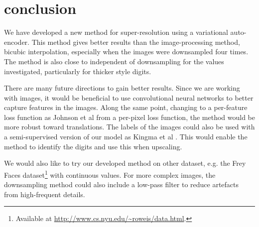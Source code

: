 \section{conclusion}
\label{sec:conclusion}

We have developed a new method for super-resolution using a variational auto-encoder.
This method gives better results than the image-processing method, bicubic interpolation, especially when the images were downsampled four times.
The method is also close to independent of downsampling for the values investigated, particularly for thicker style digits.

There are many future directions to gain better results.
Since we are working with images, it would be beneficial to use convolutional neural networks to better capture features in the images.
Along the same point, changing to a per-feature loss function as Johnson et al \cite{Johnson16} from a per-pixel loss function, the method would be more robust toward  translations.
The labels of the images could also be used with a semi-supervised version of our model as Kingma et al \cite{Kingma2014}. This would enable the method to identify the digits and use this when upscaling.

We would also like to try our developed method on other dataset, e.g. the Frey Faces dataset\footnote{Available at \url{http://www.cs.nyu.edu/~roweis/data.html}.} with continuous values.
For more complex images, the downsampling method could also include a low-pass filter to reduce artefacts from high-frequent details.
